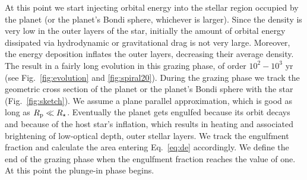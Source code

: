 \documentclass[twocolumn]{aastex62}
\begin{document}
At this point we start injecting orbital energy into the stellar region occupied by the planet (or the planet's Bondi sphere, whichever is larger). Since the density is very low in the outer layers of the star, initially the amount of orbital energy dissipated via hydrodynamic or gravitational drag is not very large. Moreover, the energy deposition inflates the outer layers, decreasing their average density. The result in a fairly long evolution in this grazing phase, of order $10^2-10^3$ yr (see Fig.~\ref{fig:evolution} and \ref{fig:spiral20}). During the grazing phase we track the geometric cross section of the planet or the planet's Bondi sphere with the star (Fig.~\ref{fig:sketch}). We assume a plane parallel approximation, which is good as long as $R_{\rm p} \ll R_{\star}$. Eventually the planet gets engulfed because its orbit decays and because of the host star's inflation, which results in heating and associated brightening of low-optical depth, outer stellar layers. We track the engulfment fraction and calculate the area entering Eq.~\ref{eq:de} accordingly. We define the end of the grazing phase when the engulfment fraction reaches the value of one. At this point the plunge-in phase begins. 
\end{document}
